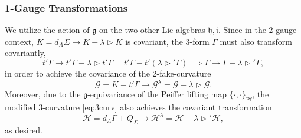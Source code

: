 \documentclass[onecolumn]{article}
\theoremstyle{theorem}
\theoremstyle{remark}
\theoremstyle{example}
\theoremstyle{definition}
\numberwithin{equation}{section}
\begin{document}
\subsubsection{1-Gauge Transformations}
We utilize the action of $\mathfrak{g}$ on the two other Lie algebras $\mathfrak{h},\mathfrak{i}$. Since in the 2-gauge context, $K=d_A\Sigma\rightarrow K - \lambda\rhd K$ is covariant, the 3-form $\Gamma$ must also transform covariantly,
\begin{equation}
    t'\Gamma\rightarrow t'\Gamma - \lambda \rhd t'\Gamma = t'\Gamma - t'(\lambda\rhd' \Gamma)\implies \Gamma\rightarrow \Gamma-\lambda\rhd' \Gamma,\nonumber
\end{equation}
in order to achieve the covariance of the 2-fake-curvature
\begin{equation}
    \mathcal{G}=K - t'\Gamma \rightarrow\mathcal{G}^\lambda = \mathcal{G}-\lambda\rhd \mathcal{G}.\nonumber
\end{equation}
{Moreover}, due to the $\mathfrak{g}$-equivariance of the Peiffer lifting map $\{\cdot,\cdot\}_\text{Pf}$, the modified 3-curvature \eqref{eq:3curv} also achieves the covariant transformation
\begin{equation}
    \mathcal{H} = d_A\Gamma + Q_\Sigma \rightarrow \mathcal{H}^\lambda=\mathcal{H} - \lambda\rhd' \mathcal{H},\label{3curv1gau}  
\end{equation}
as desired.


\end{document}
